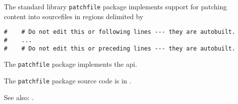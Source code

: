 
The standard library {\tt patchfile} package implements support for patching content into sourcefiles in regions delimited by
\begin{verbatim}
#    # Do not edit this or following lines --- they are autobuilt.
#    ...
#    # Do not edit this or preceding lines --- they are autobuilt.
\end{verbatim}

The {\tt patchfile} package implements the  api.

The {\tt patchfile} package source code is in .

See also:  .


